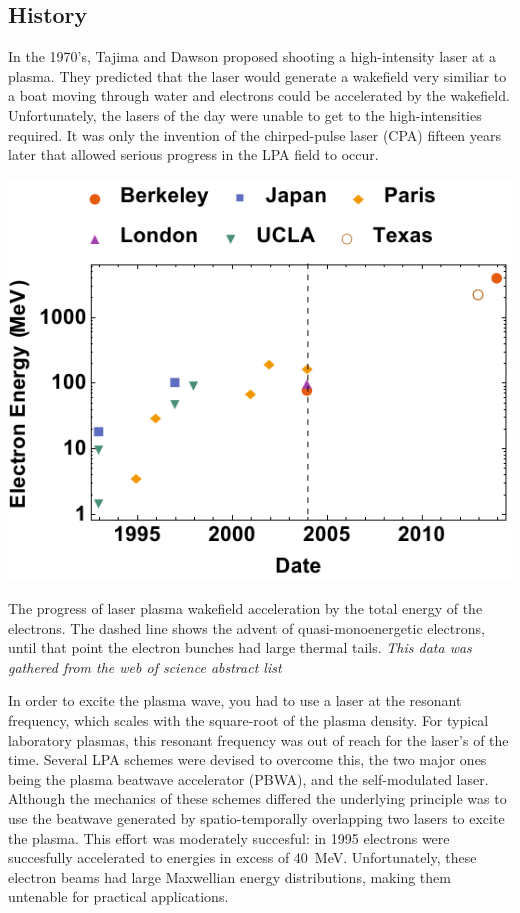 \documentclass[12pt,letter]{article}
\begin{document}
 \subsection{History}
 In the 1970's, Tajima and Dawson proposed shooting a high-intensity laser at a
 plasma\cite{PhysRevLett.43.267}. They predicted that the laser would generate a wakefield very similiar to a boat moving
 through water and electrons could be accelerated by the wakefield.
  Unfortunately, the lasers of the day were unable to get
 to the high-intensities required. It was only the invention of the
 chirped-pulse laser (CPA) fifteen years later that allowed serious progress in
 the LPA field to occur\cite{backus1998high}.
\begin{marginfigure}
	\includegraphics[width=\marginparwidth]{../figures/datfig.pdf}
    \caption{\label{fig:progress}The progress of laser plasma wakefield acceleration by the total
    energy of the electrons. The dashed line shows the advent of
    quasi-monoenergetic electrons, until that point the electron bunches had
    large thermal tails. \em This data was gathered from the web of science
abstract list}
\end{marginfigure}
In order to excite the plasma wave, you had to use a laser at the resonant
frequency, which scales with the square-root of the plasma density. For typical
laboratory plasmas, this resonant frequency was out of reach for the laser's of
the time. Several LPA schemes were devised to overcome
this, the two major ones being the plasma beatwave accelerator (PBWA), and the
self-modulated laser. Although the mechanics of these schemes differed the
underlying principle was to use the beatwave generated by spatio-temporally
overlapping two lasers to excite the plasma. This effort was moderately
succesful: in 1995 electrons were succesfully accelerated to energies in excess
of \SI{40}{\mega\electronvolt}. Unfortunately, these electron beams had large
Maxwellian energy distributions, making them untenable for practical
applications.
\end{document}
